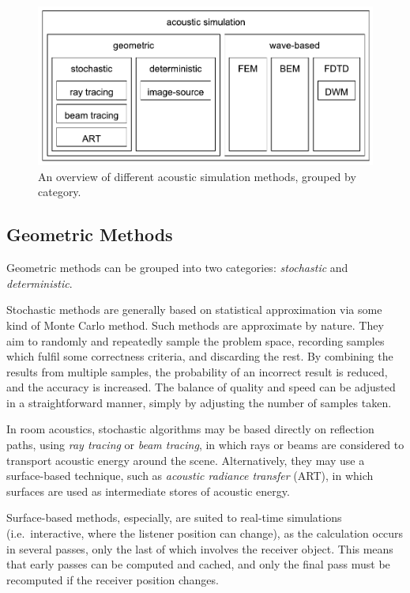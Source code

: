 \documentclass[]{scrreprt}
\begin{document}
\begin{figure}[htbp]
\centering
\includegraphics{images/simulation_techniques.pdf}
\caption{An overview of different acoustic simulation methods, grouped
by category.\label{fig:simulation_techniques}}
\end{figure}

\subsection{Geometric Methods}\label{geometric-methods}

Geometric methods can be grouped into two categories: \emph{stochastic}
and \emph{deterministic}.

Stochastic methods are generally based on statistical approximation via
some kind of Monte Carlo method. Such methods are approximate by nature.
They aim to randomly and repeatedly sample the problem space, recording
samples which fulfil some correctness criteria, and discarding the rest.
By combining the results from multiple samples, the probability of an
incorrect result is reduced, and the accuracy is increased. The balance
of quality and speed can be adjusted in a straightforward manner, simply
by adjusting the number of samples taken.

In room acoustics, stochastic algorithms may be based directly on
reflection paths, using \emph{ray tracing} or \emph{beam tracing}, in
which rays or beams are considered to transport acoustic energy around
the scene. Alternatively, they may use a surface-based technique, such
as \emph{acoustic radiance transfer} (ART), in which surfaces are used
as intermediate stores of acoustic energy.

Surface-based methods, especially, are suited to real-time simulations
(i.e.~interactive, where the listener position can change), as the
calculation occurs in several passes, only the last of which involves
the receiver object. This means that early passes can be computed and
cached, and only the final pass must be recomputed if the receiver
position changes.
\end{document}
